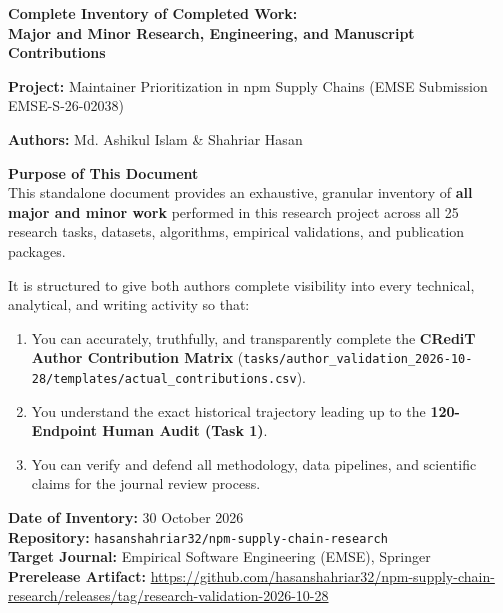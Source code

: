 \documentclass[11pt,a4paper]{article}
\begin{document}
\begin{titlepage}
\vspace*{10mm}
{\color{workblue}\Huge\bfseries Complete Inventory of Completed Work:\\[6pt]\Large Major and Minor Research, Engineering, and Manuscript Contributions\par}
\vspace{6mm}
{\large\textbf{Project:} Maintainer Prioritization in npm Supply Chains (EMSE Submission EMSE-S-26-02038)\par}
{\large\textbf{Authors:} Md. Ashikul Islam \& Shahriar Hasan\par}
\vspace{6mm}

\colorbox{workbg}{
\parbox{0.96\linewidth}{
\vspace{3mm}
\textbf{\large\color{workblue}Purpose of This Document}\\[4pt]
This standalone document provides an exhaustive, granular inventory of \textbf{all major and minor work} performed in this research project across all 25 research tasks, datasets, algorithms, empirical validations, and publication packages.

It is structured to give both authors complete visibility into every technical, analytical, and writing activity so that:
\begin{enumerate}[leftmargin=15pt,topsep=3pt]
  \item You can accurately, truthfully, and transparently complete the \textbf{CRediT Author Contribution Matrix} (\nolinkurl{tasks/author_validation_2026-10-28/templates/actual_contributions.csv}).
  \item You understand the exact historical trajectory leading up to the \textbf{120-Endpoint Human Audit (Task 1)}.
  \item You can verify and defend all methodology, data pipelines, and scientific claims for the journal review process.
\end{enumerate}
\vspace{2mm}
}
}

\vfill
\noindent\textbf{Date of Inventory:} 30 October 2026\\
\textbf{Repository:} \nolinkurl{hasanshahriar32/npm-supply-chain-research}\\
\textbf{Target Journal:} Empirical Software Engineering (EMSE), Springer\\
\textbf{Prerelease Artifact:} \url{https://github.com/hasanshahriar32/npm-supply-chain-research/releases/tag/research-validation-2026-10-28}
\end{titlepage}
\end{document}
